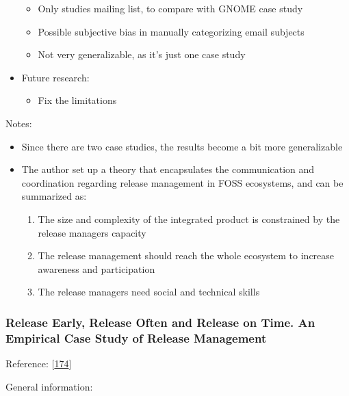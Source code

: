 \documentclass[]{book}
\providecommand{\tightlist}{%
  \setlength{\itemsep}{0pt}\setlength{\parskip}{0pt}}
\begin{document}
\begin{itemize}
  \begin{itemize}
  \tightlist
  \item
    Only studies mailing list, to compare with GNOME case study
  \item
    Possible subjective bias in manually categorizing email subjects
  \item
    Not very generalizable, as it's just one case study
  \end{itemize}
\item
  Future research:

  \begin{itemize}
  \tightlist
  \item
    Fix the limitations
  \end{itemize}
\end{itemize}

Notes:

\begin{itemize}
\tightlist
\item
  Since there are two case studies, the results become a bit more
  generalizable
\item
  The author set up a theory that encapsulates the communication and
  coordination regarding release management in FOSS ecosystems, and can
  be summarized as:

  \begin{enumerate}
  \def\labelenumi{\arabic{enumi}.}
  \tightlist
  \item
    The size and complexity of the integrated product is constrained by
    the release managers capacity
  \item
    The release management should reach the whole ecosystem to increase
    awareness and participation
  \item
    The release managers need social and technical skills
  \end{enumerate}
\end{itemize}

\subsubsection{Release Early, Release Often and Release on Time. An
Empirical Case Study of Release
Management}\label{release-early-release-often-and-release-on-time.-an-empirical-case-study-of-release-management}

Reference: {[}\protect\hyperlink{ref-teixeira2017a}{174}{]}

General information:
\end{document}
